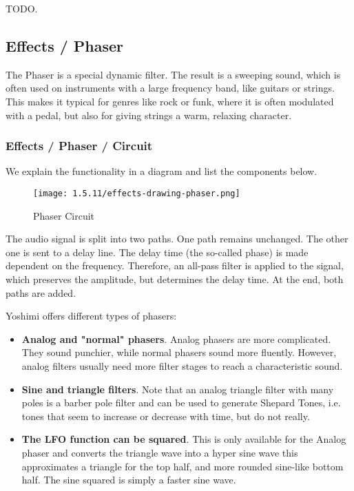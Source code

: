    TODO.

\subsection{Effects / Phaser}
\label{subsec:effects_edit_phaser}

   The Phaser is a special dynamic filter. The result is a sweeping sound,
   which is often used on instruments with a large frequency band, like
   guitars or strings. This makes it typical for genres like rock or funk,
   where it is often modulated with a pedal, but also for giving strings a
   warm, relaxing character.

\subsubsection{Effects / Phaser / Circuit}
\label{subsubsec:effects_edit_phaser_circuit}

   We explain the functionality in a diagram and list the components below.

\begin{figure}[H]
   \centering
   \texttt{[image: 1.5.11/effects-drawing-phaser.png]}
   \caption{Phaser Circuit}
   \label{fig:phaser_circuit}
\end{figure}

   The audio signal is split into two paths. One path remains unchanged. The
   other one is sent to a delay line. The delay time (the so-called phase) is
   made dependent on the frequency. Therefore, an all-pass filter is applied
   to the signal, which preserves the amplitude, but determines the delay
   time. At the end, both paths are added.

   Yoshimi offers different types of phasers:

   \begin{itemize}
      \item \textbf{Analog and "normal" phasers}.
      Analog phasers are more complicated.
      They sound punchier, while normal phasers sound more fluently. However,
      analog filters usually need more filter stages to reach a
      characteristic sound.
      \item \textbf{Sine and triangle filters}.
      Note that an analog triangle filter
      with many poles is a barber pole filter and can be used to generate
      Shepard Tones, i.e. tones that seem to increase or decrease with time,
      but do not really.
      \item \textbf{The LFO function can be squared}.
      This is only available for the Analog phaser and converts the triangle
      wave into a hyper sine wave this approximates a triangle for the top
      half, and more rounded sine-like bottom half. The sine squared is simply
      a faster sine wave.
   \end{itemize}

